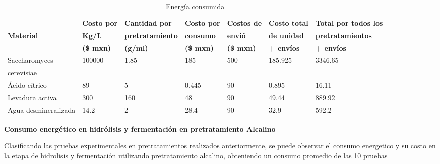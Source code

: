 \documentclass[12pt]{article}
\begin{document}
			
			
			
			
			\begin{table}[H]
				\centering
				\caption{Energía consumida }
				\label{hidrolisis costos}
					\resizebox{16cm}{!} {
				\begin{tabular}{|l|l|l|l|l|l|l|}
					\hline
					 & \textbf{Costo por  } & \textbf{Cantidad por} & \textbf{Costo por} & \textbf{Costos de}  & \textbf{Costo total }  & \textbf{Total por todos los} \\ 
					
					\textbf{Material} & \textbf{Kg/L} & \textbf{pretratamiento } & \textbf{consumo} & \textbf{envió} & \textbf{ de unidad}  & \textbf{ pretratamientos } \\ 
							~ &  \textbf{ (\$ mxn) }&\textbf{(g/ml) }  & \textbf{(\$ mxn)} &  \textbf{(\$ mxn)} & \textbf{ + envíos}  & \textbf{ + envíos}\\ \hline
					Saccharomyces  & 100000 & 1.85 & 185 & 500 & 185.925 & 3346.65  \\ 
					 cerevisiae &  & &  &  &    &  \\ \hline
					Ácido cítrico & 89 & 5 & 0.445 & 90  & 0.895  & 16.11  \\ \hline
					Levadura activa & 300 & 160 & 48 & 90  & 49.44  & 889.92  \\ \hline
					Agua desmineralizada & 14.2 & 2 & 28.4 & 90  & 32.9  & 592.2  \\ \hline
				
				\end{tabular}}
			\end{table}
			
			
		\textbf{ Consumo energético en hidrólisis y fermentación en pretratamiento Alcalino }
		
	Clasificando las pruebas experimentales en pretratamientos realizados anteriormente, se puede observar el consumo energetico y su costo en la etapa de hidrolisis y fermentación utilizando pretratamiento alcalino, obteniendo un consumo promedio de las 10 pruebas
			
\end{document}
